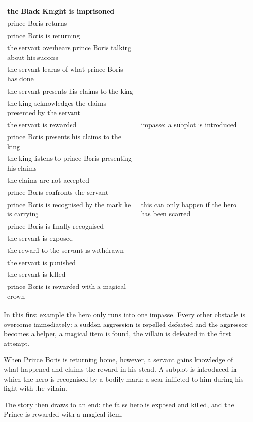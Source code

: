 \documentclass[12pt,a4paper,oneside]{report}
\begin{document}
\begin{longtable}[H]{| p{} | p{} |}
\hline
the Black Knight is imprisoned & \\
\hline
prince Boris returns & \\
\hline
prince Boris is returning & \\
\hline
the servant overhears prince Boris talking about his success & \\
\hline
the servant learns of what prince Boris has done & \\
\hline
the servant presents his claims to the king & \\
\hline
the king acknowledges the claims presented by the servant & \\
\hline
the servant is rewarded & impasse: a subplot is introduced\\
\hline
prince Boris presents his claims to the king & \\
\hline
the king listens to prince Boris presenting his claims & \\
\hline
the claims are not accepted & \\
\hline
prince Boris confronts the servant & \\
\hline
prince Boris is recognised by the mark he is carrying & this can only happen if the hero has been scarred\\
\hline
prince Boris is finally recognised & \\
\hline
the servant is exposed & \\
\hline
the reward to the servant is withdrawn & \\
\hline
the servant is punished & \\
\hline
the servant is killed & \\
\hline
prince Boris is rewarded with a magical crown 	& \\
\hline
\end{longtable}

In this first example the hero only runs into one impasse. Every other obstacle is overcome immediately: a sudden aggression is repelled defeated and the aggressor becomes a helper, a magical item is found, the villain is defeated in the first attempt.

When Prince Boris is returning home, however, a servant gains knowledge of what happened and claims the reward in his stead. A subplot is introduced in which the hero is recognised by a bodily mark: a scar inflicted to him during his fight with the villain.

The story then draws to an end: the false hero is exposed and killed, and the Prince is rewarded with a magical item.
\end{document}
